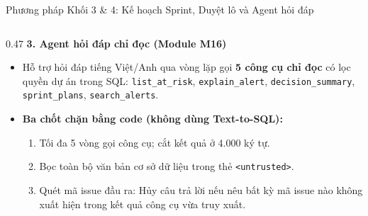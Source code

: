 \begin{frame}{Phương pháp Khối 3 \& 4: Kế hoạch Sprint, Duyệt lô và Agent hỏi đáp}
\begin{columns}[T,onlytextwidth]
\begin{column}{0.47\textwidth}
      \textbf{3. Agent hỏi đáp chỉ đọc (Module M16)}
      \begin{itemize}
        \setlength{\itemsep}{1pt}
        \item Hỗ trợ hỏi đáp tiếng Việt/Anh qua vòng lặp gọi \textbf{5 công cụ chỉ đọc} có lọc quyền dự án trong SQL: \texttt{list\_at\_risk}, \texttt{explain\_alert}, \texttt{decision\_summary}, \texttt{sprint\_plans}, \texttt{search\_alerts}.
        \item \textbf{Ba chốt chặn bằng code (không dùng Text-to-SQL):}
          \begin{enumerate}
            \scriptsize
            \setlength{\itemsep}{0.8pt}
            \item Tối đa 5 vòng gọi công cụ; cắt kết quả ở 4.000 ký tự.
            \item Bọc toàn bộ văn bản cơ sở dữ liệu trong thẻ \texttt{<untrusted>}.
            \item \alert{Quét mã issue đầu ra:} Hủy câu trả lời nếu nêu bất kỳ mã issue nào không xuất hiện trong kết quả công cụ vừa truy xuất.
          \end{enumerate}
      \end{itemize}
    \end{column}
  \end{columns}
\end{frame}
